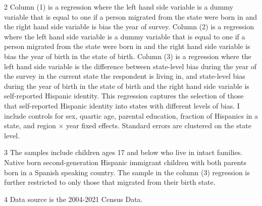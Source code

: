 \begin{table}[H]
{\begin{threeparttable}
\begin{tablenotes}
\item[2] \footnotesize{Column (1) is a regression where the left hand side variable is 
                      a dummy variable that is equal to one if a person migrated from the state
                      were born in and the right hand side variable is bias the year of survey.
                      Column (2) is a regression where the left hand side variable is 
                      a dummy variable that is equal to one if a person migrated from the state
                      were born in and the right hand side variable is bias the year of birth in the state of birth.
                      Column (3) is a regression where the left hand side variable is 
                      the difference between state-level bias during the year of the survey in the current state the 
                      respondent is living in, and state-level bias during the year of birth in the state of birth 
                      and the right hand side variable is self-reported Hispanic identity. This regression captures
                      the selection of those that self-reported Hispanic identity into states with different levels of bias.
                      I include controls for sex, quartic age, parental education, fraction of Hispanics in a state, and region × year fixed effects.
                      Standard errors are clustered on the state level.}
\item[3] \footnotesize{The samples include children ages 17 and below who live in intact families. 
                      Native born second-generation Hispanic immigrant children with both
                      parents born in a Spanish speaking country. The sample in the column (3) regression is further restricted to only those that migrated from their birth state.}
\item[4] \footnotesize{Data source is the 2004-2021 Census Data.}
\end{tablenotes}
\end{threeparttable}}
\end{table}
